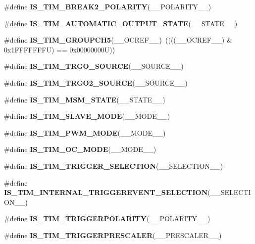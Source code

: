 \begin{DoxyCompactItemize}
\item 
\#define {\bfseries I\+S\+\_\+\+T\+I\+M\+\_\+\+B\+R\+E\+A\+K2\+\_\+\+P\+O\+L\+A\+R\+I\+TY}(\+\_\+\+\_\+\+P\+O\+L\+A\+R\+I\+T\+Y\+\_\+\+\_\+)
\item 
\#define {\bfseries I\+S\+\_\+\+T\+I\+M\+\_\+\+A\+U\+T\+O\+M\+A\+T\+I\+C\+\_\+\+O\+U\+T\+P\+U\+T\+\_\+\+S\+T\+A\+TE}(\+\_\+\+\_\+\+S\+T\+A\+T\+E\+\_\+\+\_\+)
\item 
\mbox{\label{group___t_i_m___private___macros_ga54904efe573e3ce6d13faf96d7ec5e4c}} 
\#define {\bfseries I\+S\+\_\+\+T\+I\+M\+\_\+\+G\+R\+O\+U\+P\+C\+H5}(\+\_\+\+\_\+\+O\+C\+R\+E\+F\+\_\+\+\_\+)~((((\+\_\+\+\_\+\+O\+C\+R\+E\+F\+\_\+\+\_\+) \& 0x1\+F\+F\+F\+F\+F\+F\+F\+U) == 0x00000000\+U))
\item 
\#define {\bfseries I\+S\+\_\+\+T\+I\+M\+\_\+\+T\+R\+G\+O\+\_\+\+S\+O\+U\+R\+CE}(\+\_\+\+\_\+\+S\+O\+U\+R\+C\+E\+\_\+\+\_\+)
\item 
\#define {\bfseries I\+S\+\_\+\+T\+I\+M\+\_\+\+T\+R\+G\+O2\+\_\+\+S\+O\+U\+R\+CE}(\+\_\+\+\_\+\+S\+O\+U\+R\+C\+E\+\_\+\+\_\+)
\item 
\#define {\bfseries I\+S\+\_\+\+T\+I\+M\+\_\+\+M\+S\+M\+\_\+\+S\+T\+A\+TE}(\+\_\+\+\_\+\+S\+T\+A\+T\+E\+\_\+\+\_\+)
\item 
\#define {\bfseries I\+S\+\_\+\+T\+I\+M\+\_\+\+S\+L\+A\+V\+E\+\_\+\+M\+O\+DE}(\+\_\+\+\_\+\+M\+O\+D\+E\+\_\+\+\_\+)
\item 
\#define {\bfseries I\+S\+\_\+\+T\+I\+M\+\_\+\+P\+W\+M\+\_\+\+M\+O\+DE}(\+\_\+\+\_\+\+M\+O\+D\+E\+\_\+\+\_\+)
\item 
\#define {\bfseries I\+S\+\_\+\+T\+I\+M\+\_\+\+O\+C\+\_\+\+M\+O\+DE}(\+\_\+\+\_\+\+M\+O\+D\+E\+\_\+\+\_\+)
\item 
\#define {\bfseries I\+S\+\_\+\+T\+I\+M\+\_\+\+T\+R\+I\+G\+G\+E\+R\+\_\+\+S\+E\+L\+E\+C\+T\+I\+ON}(\+\_\+\+\_\+\+S\+E\+L\+E\+C\+T\+I\+O\+N\+\_\+\+\_\+)
\item 
\#define {\bfseries I\+S\+\_\+\+T\+I\+M\+\_\+\+I\+N\+T\+E\+R\+N\+A\+L\+\_\+\+T\+R\+I\+G\+G\+E\+R\+E\+V\+E\+N\+T\+\_\+\+S\+E\+L\+E\+C\+T\+I\+ON}(\+\_\+\+\_\+\+S\+E\+L\+E\+C\+T\+I\+O\+N\+\_\+\+\_\+)
\item 
\#define {\bfseries I\+S\+\_\+\+T\+I\+M\+\_\+\+T\+R\+I\+G\+G\+E\+R\+P\+O\+L\+A\+R\+I\+TY}(\+\_\+\+\_\+\+P\+O\+L\+A\+R\+I\+T\+Y\+\_\+\+\_\+)
\item 
\#define {\bfseries I\+S\+\_\+\+T\+I\+M\+\_\+\+T\+R\+I\+G\+G\+E\+R\+P\+R\+E\+S\+C\+A\+L\+ER}(\+\_\+\+\_\+\+P\+R\+E\+S\+C\+A\+L\+E\+R\+\_\+\+\_\+)

\end{DoxyCompactItemize}
